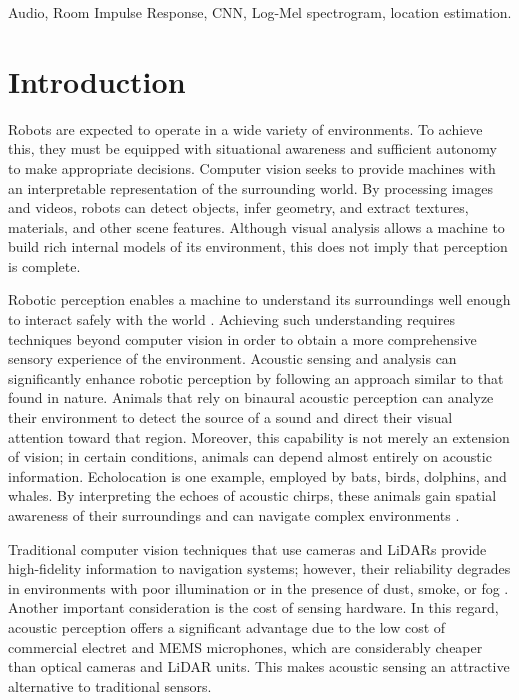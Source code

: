\documentclass[conference]{IEEEtran}
\begin{document}
\begin{IEEEkeywords}
Audio, Room Impulse Response, CNN, Log-Mel spectrogram, location estimation.
\end{IEEEkeywords}


\IEEEpeerreviewmaketitle

\section{Introduction}

Robots are expected to operate in a wide variety of environments. To achieve this, they must be equipped with situational awareness and sufficient autonomy to make appropriate decisions. Computer vision seeks to provide machines with an interpretable representation of the surrounding world. By processing images and videos, robots can detect objects, infer geometry, and extract textures, materials, and other scene features. Although visual analysis allows a machine to build rich internal models of its environment, this does not imply that perception is complete.

Robotic perception enables a machine to understand its surroundings well enough to interact safely with the world \cite{RobotV}. Achieving such understanding requires techniques beyond computer vision in order to obtain a more comprehensive sensory experience of the environment. Acoustic sensing and analysis can significantly enhance robotic perception by following an approach similar to that found in nature. Animals that rely on binaural acoustic perception can analyze their environment to detect the source of a sound and direct their visual attention toward that region. Moreover, this capability is not merely an extension of vision; in certain conditions, animals can depend almost entirely on acoustic information. Echolocation is one example, employed by bats, birds, dolphins, and whales. By interpreting the echoes of acoustic chirps, these animals gain spatial awareness of their surroundings and can navigate complex environments \cite{echoloco}.

Traditional computer vision techniques that use cameras and LiDARs provide high-fidelity information to navigation systems; however, their reliability degrades in environments with poor illumination or in the presence of dust, smoke, or fog \cite{cat1}. Another important consideration is the cost of sensing hardware. In this regard, acoustic perception offers a significant advantage due to the low cost of commercial electret and MEMS microphones, which are considerably cheaper than optical cameras and LiDAR units. This makes acoustic sensing an attractive alternative to traditional sensors.
\end{document}
